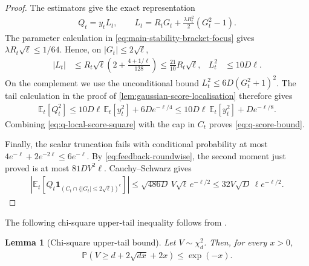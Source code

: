 \documentclass[11pt]{article}
\newtheorem{lemma}[lemma]{Lemma}
\newcommand{\E}{\mathbb E}
\newcommand{\Pp}{\mathbb P}
\newcommand{\1}{\mathbf 1}
\begin{document}
\begin{proof}
    The estimators give the exact representation
    \begin{align}
        Q_t=y_tL_t,
        \qquad
        L_t=R_tG_t+\frac{\lambda R_t^2}{2}(G_t^2-1).
        \label{eq:q-score-representation}
    \end{align}
    The parameter calculation in
    \eqref{eq:main-stability-bracket-focus} gives
    $\lambda R_t\sqrt\ell\leq1/64$. Hence, on $|G_t|\leq2\sqrt\ell$,
    \begin{align}
        |L_t|
         & \leq R_t\sqrt\ell\left(2+\frac{4+1/\ell}{128}\right)
        \leq\frac{21}{10}R_t\sqrt\ell,
         & L_t^2                                                & \leq10D\ell.
        \label{eq:q-local-score-square}
    \end{align}
    On the complement we use the unconditional bound
    $L_t^2\leq6D(G_t^2+1)^2$. The tail calculation in the proof of
    \cref{lem:gaussian-score-localisation} therefore gives
    \begin{align}
        \E_t[Q_t^2]
        \leq10D\ell\,\E_t[y_t^2]+6De^{-\ell/4}
        \leq10D\ell\,\E_t[y_t^2]+De^{-\ell/8}.
    \end{align}
    Combining \eqref{eq:q-local-score-square} with the cap in $C_t$
    proves \eqref{eq:q-score-bound}.

    Finally, the scalar truncation fails with conditional probability at
    most $4e^{-\ell}+2e^{-2\ell}\leq6e^{-\ell}$.
    By \eqref{eq:feedback-roundwise}, the second moment just proved is
    at most $81DV^2\ell$. Cauchy--Schwarz gives
    \begin{align}
        \left|\E_t\left[Q_t\1_{(C_t\cap\{|G_t|\leq2\sqrt\ell\})^c}\right]\right|
        \leq\sqrt{486D}\,V\sqrt\ell\,e^{-\ell/2}
        \leq32V\sqrt D\,\ell e^{-\ell/2}.
    \end{align}
\end{proof}

The following chi-square upper-tail inequality follows from
\citet[Lemma~1 and Eq.~(4.3)]{laurent2000adaptive}.
\begin{lemma}[Chi-square upper-tail bound]
    \label{lem:chi-square-upper-tail}
    Let $V\sim\chi_d^2$. Then, for every $x>0$,
    \begin{align}
        \Pp\left(
        V\geq d+2\sqrt{dx}+2x
        \right)
        \leq
        \exp(-x).
        \label{eq:chi-square-upper-tail}
    \end{align}
\end{lemma}
\end{document}
